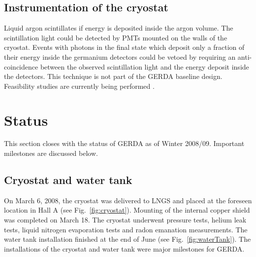 \subsection{Instrumentation of the cryostat}
\label{sec:gerda:scint}
Liquid argon scintillates if energy is deposited inside the argon
volume. The scintillation light could be detected by PMTs mounted on
the walls of the cryostat.  Events with photons in the final state
which deposit only a fraction of their energy inside the germanium
detectors could be vetoed by requiring an anti-coincidence between the
observed scintillation light and the energy deposit inside the
detectors. This technique is not part of the GERDA baseline
design. Feasibility studies are currently being performed \cite{Pei05,
Orr06}.

\section{Status}
\label{sec:gerda:stat}
This section closes with the status of GERDA as of Winter
2008/09. Important milestones are discussed below.

\subsection{Cryostat and water tank}
\label{sec:gerda:stat1}
On March 6, 2008, the cryostat was delivered to LNGS and placed at the
foreseen location in Hall A (see Fig.~\ref{fig:cryostat}). Mounting of
the internal copper shield was completed on March 18. The cryostat
underwent pressure tests, helium leak tests, liquid nitrogen
evaporation tests and radon emanation measurements. The water tank
installation finished at the end of June (see
Fig.~\ref{fig:waterTank}). The installations of the cryostat and water
tank were major milestones for GERDA.

